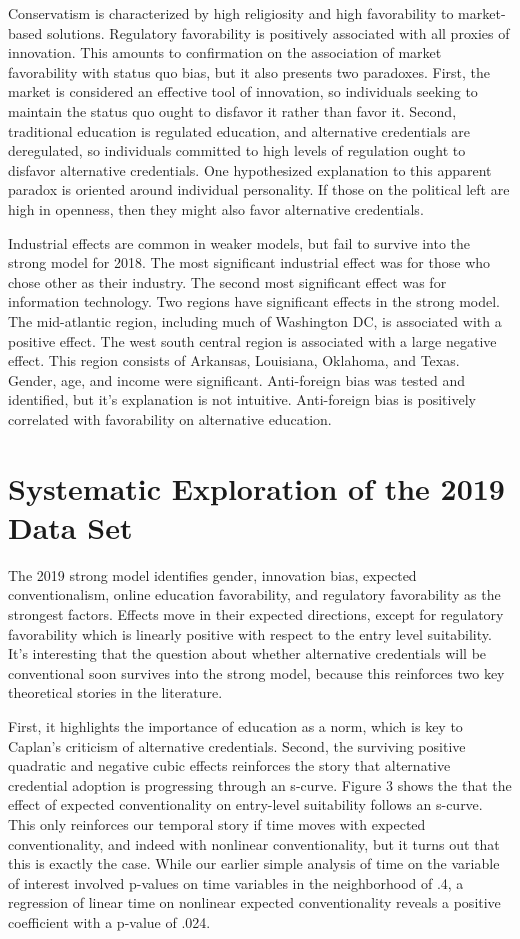 \documentclass[AER]{/Users/zyl357/Documents/GitHub/research-dissertation-case-for-alt-ed/papers/alt-ed-survey/aea-latex-templates/AEA}
\begin{document}
Conservatism is characterized by high religiosity and high favorability to
market-based solutions. Regulatory favorability is positively associated
with all proxies of innovation. This amounts to confirmation on the
association of market favorability with status quo bias, but it also
presents two paradoxes. First, the market is considered an effective tool
of innovation, so individuals seeking to maintain the status quo ought to
disfavor it rather than favor it. Second, traditional education is
regulated education, and alternative credentials are deregulated, so
individuals committed to high levels of regulation ought to disfavor
alternative credentials. One hypothesized explanation to this apparent
paradox is oriented around individual personality. If those on the
political left are high in openness, then they might also favor
alternative credentials.

Industrial effects are common in weaker models, but fail to survive into
the strong model for 2018. The most significant industrial effect was for
those who chose other as their industry. The second most significant
effect was for information technology. Two regions have significant
effects in the strong model. The mid-atlantic region, including much of
Washington DC, is associated with a positive effect. The west south
central region is associated with a large negative effect. This region
consists of Arkansas, Louisiana, Oklahoma, and Texas. Gender, age, and
income were significant. Anti-foreign bias was tested and identified, but
it’s explanation is not intuitive. Anti-foreign bias is positively
correlated with favorability on alternative education.

\section{Systematic Exploration of the 2019 Data Set}

The 2019 strong model identifies gender, innovation bias, expected
conventionalism, online education favorability, and regulatory
favorability as the strongest factors. Effects move in their expected
directions, except for regulatory favorability which is linearly positive
with respect to the entry level suitability. It’s interesting that the
question about whether alternative credentials will be conventional soon
survives into the strong model, because this reinforces two key
theoretical stories in the literature.

First, it highlights the importance of education as a norm, which is key
to Caplan’s criticism of alternative credentials. Second, the surviving
positive quadratic and negative cubic effects reinforces the story that
alternative credential adoption is progressing through an s-curve. Figure
3 shows the that the effect of expected conventionality on entry-level
suitability follows an s-curve. This only reinforces our temporal story if
time moves with expected conventionality, and indeed with nonlinear
conventionality, but it turns out that this is exactly the case. While our
earlier simple analysis of time on the variable of interest involved
p-values on time variables in the neighborhood of .4, a regression of
linear time on nonlinear expected conventionality reveals a positive
coefficient with a p-value of .024.
\end{document}
